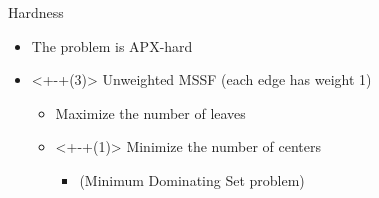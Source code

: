 \begin{frame}{Hardness}
\begin{itemize}
	\item<+> The problem is APX-hard
	\item<+-+(3)> Unweighted MSSF (each edge has weight 1)
	\begin{itemize}
	  \item<+> Maximize the number of leaves 
	  \item<+-+(1)> Minimize the number of centers 
		\begin{itemize}
		  \item<+> (Minimum Dominating Set problem)
		\end{itemize}
	\end{itemize}
\end{itemize}

\vfill

\centering


\end{frame}